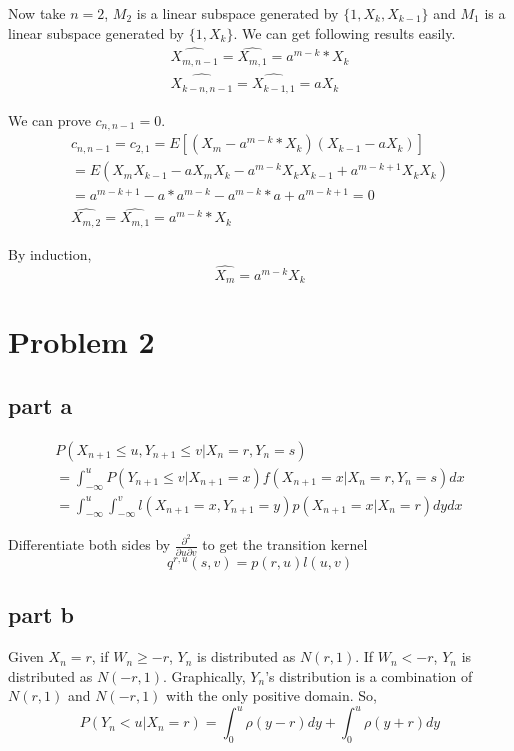\documentclass[a4paper,10pt]{article}
\begin{document}
Now take $n=2$, $M_2$ is a linear subspace generated by $\{1, X_k, X_{k-1}\}$ and $M_1$ is a linear subspace generated by $\{1, X_k\}$. We can get following results easily.
\begin{eqnarray}
\hat{X_{m,n-1}} = \hat{X_{m,1}} = a^{m-k}*X_k \\
\hat{X_{k-n,n-1}} = \hat{X_{k-1,1}} = aX_{k}
\end{eqnarray}

We can prove $c_{n,n-1}=0$.
\begin{eqnarray}
 c_{n,n-1} = c_{2,1} = E[(X_m - a^{m-k}*X_k)(X_{k-1} - aX_{k})] \nonumber \\
= E(X_m X_{k-1} - aX_mX_k - a^{m-k}X_kX_{k-1} + a^{m-k+1}X_kX_k) \nonumber\\
= a^{m-k+1} - a*a^{m-k} - a^{m-k}*a + a^{m-k+1} = 0 \\
\hat{X_{m,2}} = \hat{X_{m,1}} = a^{m-k}*X_k
\end{eqnarray}

By induction,
\begin{equation}
\hat{X_m} = a^{m-k}X_k
\end{equation}

\section{Problem 2}
\subsection{part a}
\begin{eqnarray}
P(X_{n+1} \leq u, Y_{n+1} \leq v | X_n=r, Y_n=s) \nonumber \\
= \int_{-\infty}^u P(Y_{n+1} \leq v | X_{n+1}=x) f(X_{n+1} = x|X_n=r, Y_n=s) dx \nonumber \\
= \int_{-\infty}^u \int_{-\infty}^v l(X_{n+1}=x, Y_{n+1}=y) p(X_{n+1}=x|X_n=r) dy dx \nonumber
\end{eqnarray}

Differentiate both sides by $\frac{\partial^2}{\partial u \partial v}$ to get the transition kernel
\begin{equation}
 q^{r,u}(s,v) = p(r,u)l(u,v)
\end{equation}

\subsection{part b}
Given $X_n=r$, if $W_n \geq -r$, $Y_n$ is distributed as $N(r,1)$. If $W_n < -r$, $Y_n$ is distributed as $N(-r,1)$. Graphically, $Y_n$'s distribution is a combination of $N(r,1)$ and $N(-r,1)$ with the only positive domain. So,
\begin{equation}
 P(Y_n<u|X_n=r) = \int_0^u \rho(y-r)dy + \int_0^u \rho(y+r)dy \nonumber
\end{equation}
\end{document}

